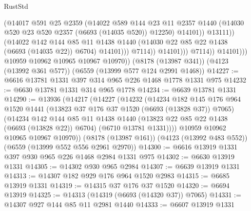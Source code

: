 \begin{lexlean}{RustStd}
\begin{coremodule}
                                    (@14017
                                      @591
                                      @25
                                      @2359
                                      (@14022
                                        @589
                                        @144
                                        @23
                                        @11
                                        @2357
                                        @1440
                                        (@14030 @520 @23 @520 @2357 (@6693 (@14035 @520)) @12250)
                                        @14101))
                                    @13111))
                                (@14022
                                  @142
                                  @144
                                  @85
                                  @11
                                  @1438
                                  @1440
                                  (@14030 @22 @85 @22 @1438 (@6693 (@14035 @22)) @6704)
                                  @14101)))
                            @7114))
                        @14101)))
                  @7114))
              @14101)))
        @10959
        @10962
        @10965
        @10967
        @10970))
    (@8178 (@13987 @341))
    (@4123 (@13992 @361 @577))
    (@6559 (@13999 @577 @124 @2991 @1468))
@14227 := @6616 @13781 @1331 @397 @314 @965 @226 @1468 @1778 @1331 @975
@14232 := @6630 @13781 @1331 @314 @965 @1778
@14234 := @6639 @13781 @1331
@14290 := @13936
    (@14217
      (@14227
        (@14232
          (@14234
            @182
            @145
            @176
            @964
            @1520
            @1441
            (@13823 @37 @176 @37 @1520 (@6693 (@13828 @37)) @7065)
            (@14234
              @142
              @144
              @85
              @11
              @1438
              @1440
              (@13823 @22 @85 @22 @1438 (@6693 (@13828 @22)) @6704)
              (@6710 @13781 @1331))))
        @10959
        @10962
        @10965
        @10967
        @10970))
    (@8178 (@13987 @161))
    (@4123 (@13992 @483 @552))
    (@6559 (@13999 @552 @556 @2961 @2970))
@14300 := @6616 @13919 @1331 @397 @930 @965 @226 @1468 @2984 @1331 @975
@14302 := @6630 @13919 @1331
@14305 := @14302 @930 @965 @2984
@14307 := @6639 @13919 @1331
@14313 := @14307 @182 @929 @176 @964 @1520 @2983
@14315 := @6685 @13919 @1331
@14319 := @14315 @37 @176 @37 @1520
@14320 := @6694 @13919
@14325 := @14313 (@14319 (@6693 (@14320 @37)) @7065)
@14331 := @14307 @927 @144 @85 @11 @2981 @1440
@14333 := @6607 @13919 @1331

\end{coremodule}
\end{lexlean}
